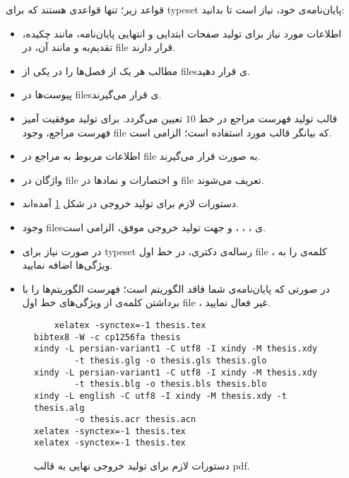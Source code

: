 		قواعد زیر؛ تنها قواعدی هستند که برای \gls{typeset} پایان‌نامه‌ی خود، نیاز است تا بدانید:
	\begin{itemize}
		\item اطلاعات مورد نیاز برای تولید صفحات ابتدایی و انتهایی پایان‌نامه، مانند چکیده‌، تقدیم‌به و مانند آن، در \gls{file}  قرار دارند. 
		\item مطالب هر یک از فصل‌ها را در یکی از \glspl{file}ی  قرار دهید.
		\item پیوست‌ها در  \glspl{file}ی  قرار می‌گیرند.
		\item قالب تولید فهرست مراجع در خط $10$ تعیین می‌گردد. برای تولید موفقیت آمیز فهرست مراجع، وجود \gls{file}  که  بیانگر قالب مورد استفاده است؛ الزامی است.
		\item اطلاعات مربوط به مراجع در \gls{file}  به صورت  قرار می‌گیرند.
		\item واژگان در \gls{file}  و اختصارات و نمادها در \gls{file}  تعریف می‌شوند.
		\item دستورات لازم برای تولید خروجی در شکل \ref{fig:ch1:output_cmd} آمده‌اند. 
		\item وجود \glspl{file}ی ، ، ، و  جهت تولید خروجی موفق، الزامی است.
		\item در صورت نیاز برای \gls{typeset} رساله‌ی دکتری، در خط اول \gls{file} ، کلمه‌ی  را به ویژگی‌ها اضافه نمایید.
		\item در صورتی که پایان‌نامه‌ی شما فاقد الگوریتم است؛ فهرست الگوریتم‌ها را با برداشتن کلمه‌ی  از ویژگی‌های خط اول \gls{file} ، غیر فعال نمایید.
	\end{itemize}
				\begin{figure}
		\begin{latin}
\centering
	\begin{verbatim}
	xelatex -synctex=-1 thesis.tex
bibtex8 -W -c cp1256fa thesis
xindy -L persian-variant1 -C utf8 -I xindy -M thesis.xdy 
        -t thesis.glg -o thesis.gls thesis.glo
xindy -L persian-variant1 -C utf8 -I xindy -M thesis.xdy 
        -t thesis.blg -o thesis.bls thesis.blo
xindy -L english -C utf8 -I xindy -M thesis.xdy -t thesis.alg 
        -o thesis.acr thesis.acn
xelatex -synctex=-1 thesis.tex
xelatex -synctex=-1 thesis.tex
	\end{verbatim}
	\end{latin}
\caption{دستورات لازم برای تولید خروجی نهایی به قالب \gls*{pdf}.}
\label{fig:ch1:output_cmd}
\end{figure}
